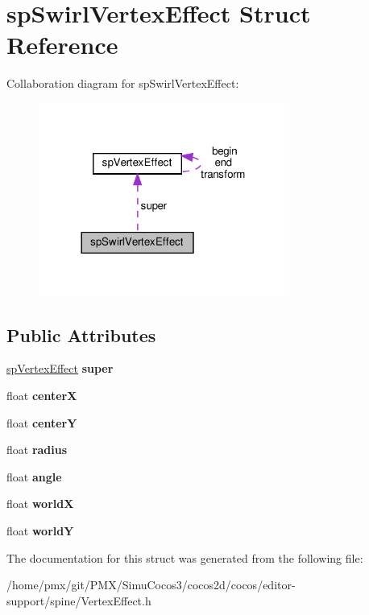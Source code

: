 \hypertarget{structspSwirlVertexEffect}{}\section{sp\+Swirl\+Vertex\+Effect Struct Reference}
\label{structspSwirlVertexEffect}


Collaboration diagram for sp\+Swirl\+Vertex\+Effect\+:
\nopagebreak
\begin{figure}[H]
\begin{center}
\leavevmode
\includegraphics[width=233pt]{structspSwirlVertexEffect__coll__graph}
\end{center}
\end{figure}
\subsection*{Public Attributes}
\begin{DoxyCompactItemize}
\item 
\mbox{\label{structspSwirlVertexEffect_a3bd1ac17615acf4962260eb64e1bd753}} 
\hyperlink{structspVertexEffect}{sp\+Vertex\+Effect} {\bfseries super}
\item 
\mbox{\label{structspSwirlVertexEffect_a7bd1bf589635a37cdaeff795634fbb57}} 
float {\bfseries centerX}
\item 
\mbox{\label{structspSwirlVertexEffect_a3fc91019988386e5dcd40dfe5c30d926}} 
float {\bfseries centerY}
\item 
\mbox{\label{structspSwirlVertexEffect_a80bf01da571abaa235fb36826d49f3de}} 
float {\bfseries radius}
\item 
\mbox{\label{structspSwirlVertexEffect_a7c408e7e0c0359775390eeb01ce21db7}} 
float {\bfseries angle}
\item 
\mbox{\label{structspSwirlVertexEffect_a8cb30846f7b79f48442028983175138e}} 
float {\bfseries worldX}
\item 
\mbox{\label{structspSwirlVertexEffect_aa834ee3a21bac5600f8b40fd6533ba6e}} 
float {\bfseries worldY}
\end{DoxyCompactItemize}


The documentation for this struct was generated from the following file\+:\begin{DoxyCompactItemize}
\item 
/home/pmx/git/\+P\+M\+X/\+Simu\+Cocos3/cocos2d/cocos/editor-\/support/spine/Vertex\+Effect.\+h\end{DoxyCompactItemize}
